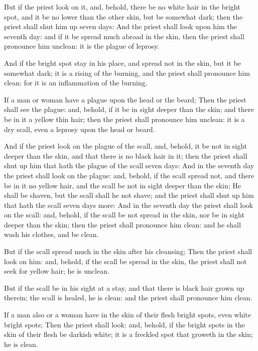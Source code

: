 \verse But if the priest look on it, and, behold, there be no white hair in the bright spot, and it be no lower than the other skin, but be somewhat dark; then the priest shall shut him up seven days: \verse And the priest shall look upon him the seventh day: and if it be spread much abroad in the skin, then the priest shall pronounce him unclean: it is the plague of leprosy.

\verse And if the bright spot stay in his place, and spread not in the skin, but it be somewhat dark; it is a rising of the burning, and the priest shall pronounce him clean: for it is an inflammation of the burning.

\verse If a man or woman have a plague upon the head or the beard; \verse Then the priest shall see the plague: and, behold, if it be in sight deeper than the skin; and there be in it a yellow thin hair; then the priest shall pronounce him unclean: it is a dry scall, even a leprosy upon the head or beard.

\verse And if the priest look on the plague of the scall, and, behold, it be not in sight deeper than the skin, and that there is no black hair in it; then the priest shall shut up him that hath the plague of the scall seven days: \verse And in the seventh day the priest shall look on the plague: and, behold, if the scall spread not, and there be in it no yellow hair, and the scall be not in sight deeper than the skin; \verse He shall be shaven, but the scall shall he not shave; and the priest shall shut up him that hath the scall seven days more: \verse And in the seventh day the priest shall look on the scall: and, behold, if the scall be not spread in the skin, nor be in sight deeper than the skin; then the priest shall pronounce him clean: and he shall wash his clothes, and be clean.

\verse But if the scall spread much in the skin after his cleansing; \verse Then the priest shall look on him: and, behold, if the scall be spread in the skin, the priest shall not seek for yellow hair; he is unclean.

\verse But if the scall be in his sight at a stay, and that there is black hair grown up therein; the scall is healed, he is clean: and the priest shall pronounce him clean.

\verse If a man also or a woman have in the skin of their flesh bright spots, even white bright spots; \verse Then the priest shall look: and, behold, if the bright spots in the skin of their flesh be darkish white; it is a freckled spot that groweth in the skin; he is clean.

